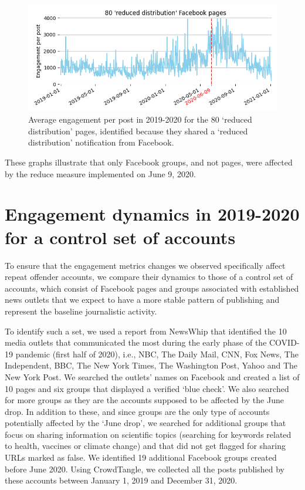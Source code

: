 \documentclass[review]{elsarticle}
\begin{document}
\begin{figure}[!h]
\centering
\includegraphics[scale=0.5]{./../figure/supplementary_engagement_pages_reduce.png}
\caption{
Average engagement per post in 2019-2020 for the 80 `reduced distribution' pages, identified because they shared a `reduced distribution' notification from Facebook.
}
\label{engagement_groups_and_pages_reduce}
\end{figure}

These graphs illustrate that only Facebook groups, and not pages, were affected by the reduce measure implemented on June 9, 2020.

\section*{Engagement dynamics in 2019-2020 for a control set of accounts}

To ensure that the engagement metrics changes we observed specifically affect repeat offender accounts, we compare their dynamics to those of a control set of accounts, which consist of Facebook pages and groups associated with established news outlets that we expect to have a more stable pattern of publishing and represent the baseline journalistic activity. 

To identify such a set, we used a report from NewsWhip \citep{NewsWhipReport} that identified the 10 media outlets that communicated the most during the early phase of the COVID-19 pandemic (first half of 2020), i.e., NBC, The Daily Mail, CNN, Fox News, The Independent, BBC, The New York Times, The Washington Post, Yahoo and The New York Post.
We searched the outlets' names on Facebook and created a list of 10 pages and six groups that displayed a verified `blue check'.
We also searched for more groups as they are the accounts supposed to be affected by the June drop.
In addition to these, and since  groups are the only type of accounts potentially affected by the `June drop', we searched for additional groups that focus on sharing information on scientific topics (searching for keywords related to health, vaccines or climate change) and that did not get flagged for sharing URLs marked as false.
We identified 19 additional Facebook groups created before June 2020.
Using CrowdTangle, we collected all the posts published by these accounts between January 1, 2019 and December 31, 2020.
\end{document}
